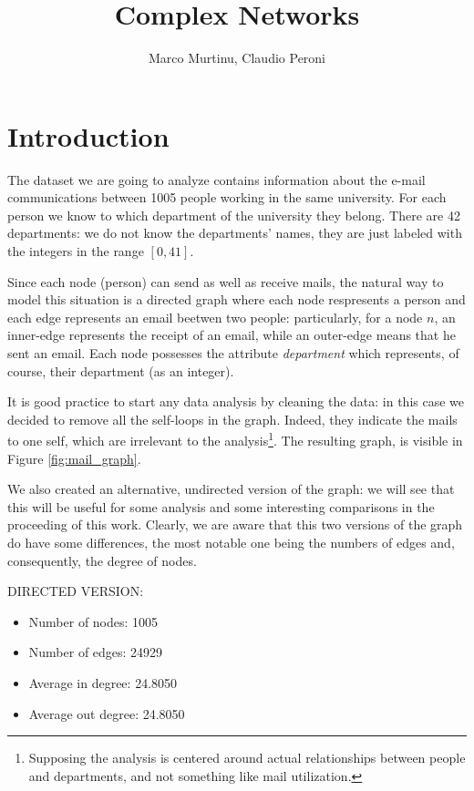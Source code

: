 \documentclass{report}
\title{Complex Networks}
\author{{Marco Murtinu, Claudio Peroni}}
\theoremstyle{definition}
\theoremstyle{remark}
\begin{document}
	\maketitle
\section*{Introduction}	
The dataset we are going to analyze contains information about the e-mail communications between 1005 people working in the same university. For each person we know to which department of the university they belong. There are 42 departments: we do not know the departments' names, they are just labeled with the integers in the range $[0, 41]$.

Since each node (person) can send as well as receive mails, the natural way to model this situation is a directed graph where each node respresents a person and each edge represents an email beetwen two people: particularly, for a node $n$, an inner-edge represents the receipt of an email, while an outer-edge means that he sent an email. Each node possesses the attribute \textit{department} which represents, of course, their department (as an integer).

It is good practice to start any data analysis by cleaning the data: in this case we decided to remove all the self-loops in the graph. Indeed, they indicate the mails to one self, which are irrelevant to the analysis\footnote{Supposing the analysis is centered around actual relationships between people and departments, and not something like mail utilization.}. The resulting graph, is visible in Figure \ref{fig:mail_graph}.

We also created an alternative, undirected version of the graph: we will see that this will be useful for some analysis and some interesting comparisons in the proceeding of this work. Clearly, we are aware that this two versions of the graph do have some differences, the most notable one being the numbers of edges and, consequently, the degree of nodes.
\bigskip

DIRECTED VERSION:

\begin{itemize}
\item Number of nodes: 1005
\item Number of edges: 24929
\item Average in degree: 24.8050
\item Average out degree: 24.8050
\end{itemize}
\end{document}

